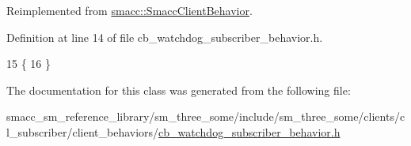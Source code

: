 Reimplemented from \hyperlink{classsmacc_1_1SmaccClientBehavior_a7962382f93987c720ad432fef55b123f}{smacc\+::\+Smacc\+Client\+Behavior}.



Definition at line 14 of file cb\+\_\+watchdog\+\_\+subscriber\+\_\+behavior.\+h.


\begin{DoxyCode}
15     \{
16     \}
\end{DoxyCode}


The documentation for this class was generated from the following file\+:\begin{DoxyCompactItemize}
\item 
smacc\+\_\+sm\+\_\+reference\+\_\+library/sm\+\_\+three\+\_\+some/include/sm\+\_\+three\+\_\+some/clients/cl\+\_\+subscriber/client\+\_\+behaviors/\hyperlink{cb__watchdog__subscriber__behavior_8h}{cb\+\_\+watchdog\+\_\+subscriber\+\_\+behavior.\+h}\end{DoxyCompactItemize}
